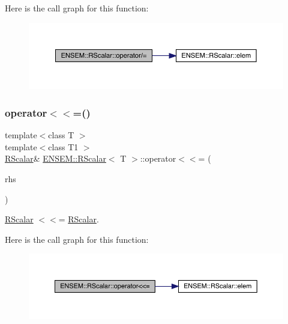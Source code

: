 Here is the call graph for this function\+:
\nopagebreak
\begin{figure}[H]
\begin{center}
\leavevmode
\includegraphics[width=350pt]{d0/d8c/classENSEM_1_1RScalar_a8d8cc49d7fed142b93c987c653465000_cgraph}
\end{center}
\end{figure}
\mbox{\label{classENSEM_1_1RScalar_a4f12bedac2ac4848354e3c3018f6c9aa}} 
\subsubsection{\texorpdfstring{operator$<$$<$=()}{operator<<=()}\hspace{0.1cm}{\footnotesize\ttfamily [1/3]}}
{\footnotesize\ttfamily template$<$class T $>$ \\
template$<$class T1 $>$ \\
\mbox{\hyperlink{classENSEM_1_1RScalar}{R\+Scalar}}\& \mbox{\hyperlink{classENSEM_1_1RScalar}{E\+N\+S\+E\+M\+::\+R\+Scalar}}$<$ T $>$\+::operator$<$$<$= (\begin{DoxyParamCaption}\item[{const \mbox{\hyperlink{classENSEM_1_1RScalar}{R\+Scalar}}$<$ T1 $>$ \&}]{rhs }\end{DoxyParamCaption})\hspace{0.3cm}{\ttfamily [inline]}}



\mbox{\hyperlink{classENSEM_1_1RScalar}{R\+Scalar}} $<$$<$= \mbox{\hyperlink{classENSEM_1_1RScalar}{R\+Scalar}}. 

Here is the call graph for this function\+:
\nopagebreak
\begin{figure}[H]
\begin{center}
\leavevmode
\includegraphics[width=350pt]{d0/d8c/classENSEM_1_1RScalar_a4f12bedac2ac4848354e3c3018f6c9aa_cgraph}
\end{center}
\end{figure}
\mbox{\label{classENSEM_1_1RScalar_a4f12bedac2ac4848354e3c3018f6c9aa}} 
